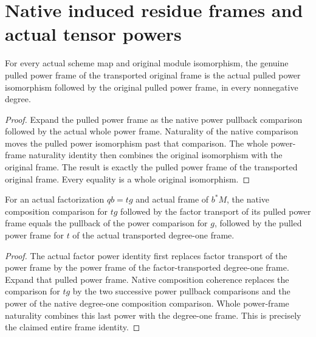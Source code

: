 \section{Native induced residue frames and actual tensor powers}

\begin{lemma}\label{lem:actual-pulled-power-frame-naturality}
\leanok
{}
For every actual scheme map and original module isomorphism, the
genuine pulled power frame of the transported original frame is
the actual pulled power isomorphism followed by the original
pulled power frame, in every nonnegative degree.
\end{lemma}
\begin{proof}
Expand the pulled power frame as the native power pullback
comparison followed by the actual whole power frame. Naturality
of the native comparison moves the pulled power isomorphism past
that comparison. The whole power-frame naturality identity then
combines the original isomorphism with the original frame. The
result is exactly the pulled power frame of the transported
original frame. Every equality is a whole original isomorphism.
\end{proof}

\begin{lemma}\label{lem:actual-factor-power-frame-composition}
\leanok
{}
For an actual factorization $qb=tg$ and actual frame of $b^*M$,
the native composition comparison for $tg$ followed by the factor
transport of its pulled power frame equals the pullback of the
power comparison for $g$, followed by the pulled power frame for
$t$ of the actual transported degree-one frame.
\end{lemma}
\begin{proof}
The actual factor power identity first replaces factor transport
of the power frame by the power frame of the factor-transported
degree-one frame. Expand that pulled power frame. Native
composition coherence replaces the comparison for $tg$ by the
two successive power pullback comparisons and the power of the
native degree-one composition comparison. Whole power-frame
naturality combines this last power with the degree-one frame.
This is precisely the claimed entire frame identity.
\end{proof}

